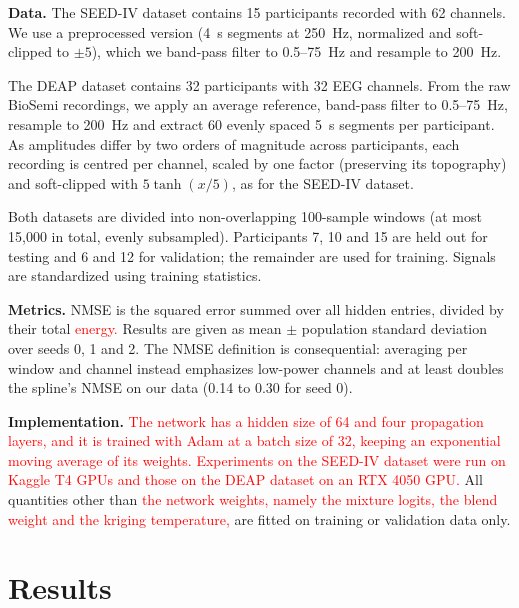 \documentclass{article}
\begin{document}
\textbf{Data.} The SEED-IV dataset \cite{zheng2019emotionmeter} contains 15
participants recorded with 62 channels. We use a preprocessed version
(4~s segments at 250~Hz, normalized and soft-clipped to $\pm5$), which we
band-pass filter to 0.5--75~Hz and resample to 200~Hz.

The DEAP dataset \cite{koelstra2012deap} contains 32 participants with 32 EEG
channels. From the raw BioSemi recordings, we apply an average reference,
band-pass filter to 0.5--75~Hz, resample to 200~Hz and extract 60 evenly
spaced 5~s segments per participant. As amplitudes differ by two orders
of magnitude across participants, each recording is centred per channel,
scaled by one factor (preserving its topography) and soft-clipped with
$5\tanh(x/5)$, as for the SEED-IV dataset.

Both datasets are divided into non-overlapping 100-sample windows (at most
15{,}000 in total, evenly subsampled). Participants 7, 10 and 15 are held out for testing and 6 and 12
for validation; the remainder are used for training. Signals are
standardized using training statistics.

\textbf{Metrics.} NMSE is the squared error summed over all hidden entries,
divided by their total \textcolor{red}{energy.} Results are given as mean $\pm$
population standard deviation over seeds 0, 1 and 2. The NMSE definition
is consequential: averaging per window and channel instead emphasizes
low-power channels and at least doubles the spline's NMSE on our data
(0.14 to 0.30 for seed 0).

\textbf{Implementation.} \textcolor{red}{The network has a hidden size of 64 and four
propagation layers, and it is trained with Adam at a batch size of 32,
keeping an exponential moving average of its weights. Experiments on the
SEED-IV dataset were run on Kaggle T4 GPUs and those on the DEAP dataset
on an RTX 4050 GPU.} All quantities other than \textcolor{red}{the network weights, namely
the mixture logits, the blend weight and the kriging temperature,} are
fitted on training or validation data only.

\section{Results}
\label{sec:results}
\end{document}
